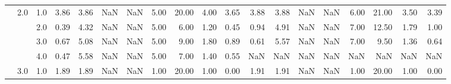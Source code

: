 \begin{tabular}{lllrrrrrrrrrrrrrrrr}
       & 2.0 & 1.0  &      3.86 &       3.86 &               NaN &                NaN & 5.00 &  20.00 &             4.00 &                         3.65 &      3.88 &       3.88 &               NaN &                NaN & 6.00 &  21.00 &             3.50 &                         3.39 \\
       &     & 2.0  &      0.39 &       4.32 &               NaN &                NaN & 5.00 &   6.00 &             1.20 &                         0.45 &      0.94 &       4.91 &               NaN &                NaN & 7.00 &  12.50 &             1.79 &                         1.00 \\
       &     & 3.0  &      0.67 &       5.08 &               NaN &                NaN & 5.00 &   9.00 &             1.80 &                         0.89 &      0.61 &       5.57 &               NaN &                NaN & 7.00 &   9.50 &             1.36 &                         0.64 \\
       &     & 4.0  &      0.47 &       5.58 &               NaN &                NaN & 5.00 &   7.00 &             1.40 &                         0.55 &       NaN &        NaN &               NaN &                NaN &  NaN &    NaN &              NaN &                          NaN \\
       & 3.0 & 1.0  &      1.89 &       1.89 &               NaN &                NaN & 1.00 &  20.00 &             1.00 &                         0.00 &      1.91 &       1.91 &               NaN &                NaN & 1.00 &  20.00 &             1.00 &                         0.00 \\
\bottomrule
\end{tabular}
